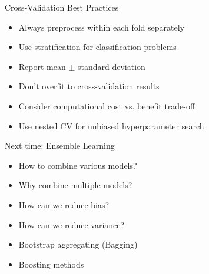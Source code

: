 \documentclass[usenames,dvipsnames]{beamer}
\begin{document}
\begin{frame}{Cross-Validation Best Practices}
\begin{itemize}
	\item \pause Always preprocess within each fold separately
	\item \pause Use stratification for classification problems
	\item \pause Report mean $\pm$ standard deviation
	\item \pause Don't overfit to cross-validation results
	\item \pause Consider computational cost vs. benefit trade-off
	\item \pause Use nested CV for unbiased hyperparameter search
\end{itemize}
\end{frame}

\begin{frame}{Next time: Ensemble Learning}
\begin{itemize}
\item How to combine various models?
\item Why combine multiple models?
\item How can we reduce bias?
\item How can we reduce variance?
\item Bootstrap aggregating (Bagging)
\item Boosting methods
\end{itemize}
\end{frame}
\end{document}
